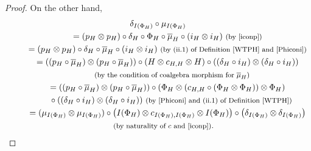 \documentclass[pdftex]{sigma}
\numberwithin{equation}{section}
\begin{document}
\begin{proof}
On the other hand,
\begin{gather*}
 \delta_{I(\Phi_{H})}\circ\mu_{I(\Phi_{H})}\\
 \qquad{}= (p_{H}\otimes p_{H})\circ\delta_{H}\circ\Phi_{H}\circ\overline{\mu}_{H}\circ (i_{H}\otimes i_{H})\ \text{\footnotesize\textnormal{(by \eqref{iconp})}}\\
 \qquad{}= (p_{H}\otimes p_{H})\circ\delta_{H}\circ\overline{\mu}_{H}\circ(i_{H}\otimes i_{H})\ \text{\footnotesize\textnormal{(by (ii.1) of Definition \ref{WTPH} and \eqref{Phiconi})}}\\
 \qquad{}= ((p_{H}\circ\overline{\mu}_{H})\otimes(p_{H}\circ\overline{\mu}_{H}))\circ(H\otimes c_{H,H}\otimes H)\circ((\delta_{H}\circ i_{H})\otimes(\delta_{H}\circ i_{H}))\\
 \qquad\quad{}\ \text{\footnotesize\textnormal{(by the condition of coalgebra morphism for $\overline{\mu}_{H}$)}}\\
 \qquad{}= ((p_{H}\circ\overline{\mu}_{H})\otimes(p_{H}\circ\overline{\mu}_{H}))\circ(\Phi_{H}\otimes (c_{H,H}\circ(\Phi_{H}\otimes \Phi_{H}))\otimes \Phi_{H})\\
 \qquad\quad{} \circ((\delta_{H}\circ i_{H})\otimes(\delta_{H}\circ i_{H}))\ \text{\footnotesize\textnormal{(by \eqref{Phiconi} and (ii.1) of Definition \ref{WTPH})}}\\
 \qquad{}= (\mu_{I(\Phi_{H})}\otimes\mu_{I(\Phi_{H})})\circ\bigl(I(\Phi_{H})\otimes c_{I(\Phi_{H}),I(\Phi_{H})}\otimes I(\Phi_{H})\bigr)\circ\bigl(\delta_{I(\Phi_{H})}\otimes\delta_{I(\Phi_{H})}\bigr)\\
 \qquad\quad{}\ \text{\footnotesize\textnormal{(by naturality of $c$ and \eqref{iconp})}}.\tag*{\qed}
\end{gather*}
\renewcommand{\qed}{}
\end{proof}
\end{document}
